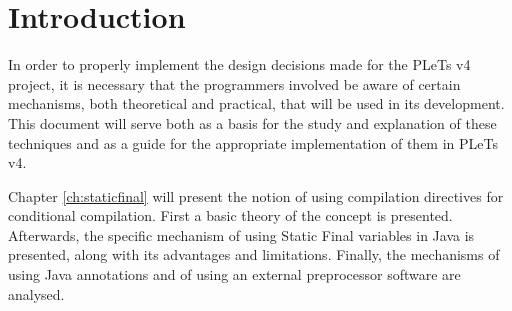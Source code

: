 \chapter*{Introduction}

In order to properly implement the design decisions made for the PLeTs v4 project, it is necessary that the programmers involved be aware of certain mechanisms, both theoretical and practical, that will be used in its development. This document will serve both as a basis for the study and explanation of these techniques and as a guide for the appropriate implementation of them in PLeTs v4.

Chapter \ref{ch:staticfinal} will present the notion of using compilation directives for conditional compilation. First a basic theory of the concept is presented. Afterwards, the specific mechanism of using Static Final variables in Java is presented, along with its advantages and limitations. Finally, the mechanisms of using Java annotations and of using an external preprocessor software are analysed.
